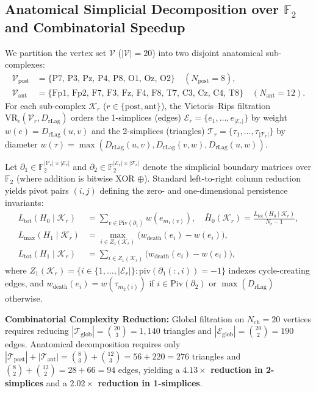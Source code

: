 \documentclass[10pt,twocolumn]{article}
\begin{document}
\subsection{Anatomical Simplicial Decomposition over $\mathbb{F}_2$ and Combinatorial Speedup}
We partition the vertex set $\mathcal{V}$ ($|\mathcal{V}|=20$) into two disjoint anatomical sub-complexes:
\begin{align}
    \mathcal{V}_{\mathrm{post}} &= \{\text{P7, P3, Pz, P4, P8, O1, Oz, O2}\} \quad (N_{\mathrm{post}} = 8), \\
    \mathcal{V}_{\mathrm{ant}} &= \{\text{Fp1, Fp2, F7, F3, Fz, F4, F8, T7, C3, Cz, C4, T8}\} \quad (N_{\mathrm{ant}} = 12).
\end{align}
For each sub-complex $\mathcal{K}_r$ ($r \in \{\mathrm{post}, \mathrm{ant}\}$), the Vietoris--Rips filtration $\mathrm{VR}_\epsilon(\mathcal{V}_r, D_{\mathrm{rLag}})$ orders the 1-simplices (edges) $\mathcal{E}_r = \{e_1,\dots,e_{|\mathcal{E}_r|}\}$ by weight $w(e) = D_{\mathrm{rLag}}(u,v)$ and the 2-simplices (triangles) $\mathcal{T}_r = \{\tau_1,\dots,\tau_{|\mathcal{T}_r|}\}$ by diameter $w(\tau) = \max(D_{\mathrm{rLag}}(u,v), D_{\mathrm{rLag}}(v,w), D_{\mathrm{rLag}}(u,w))$.

Let $\partial_1 \in \mathbb{F}_2^{|\mathcal{V}_r| \times |\mathcal{E}_r|}$ and $\partial_2 \in \mathbb{F}_2^{|\mathcal{E}_r| \times |\mathcal{T}_r|}$ denote the simplicial boundary matrices over $\mathbb{F}_2$ (where addition is bitwise XOR $\oplus$). Standard left-to-right column reduction yields pivot pairs $(i, j)$ defining the zero- and one-dimensional persistence invariants:
\begin{align}
    L_{\mathrm{tot}}(H_0 \mid \mathcal{K}_r) &= \sum_{v \in \mathrm{Piv}(\partial_1)} w(e_{m_1(v)}), \quad \bar{H}_0(\mathcal{K}_r) = \frac{L_{\mathrm{tot}}(H_0 \mid \mathcal{K}_r)}{N_r - 1}, \\
    L_{\max}(H_1 \mid \mathcal{K}_r) &= \max_{i \in Z_1(\mathcal{K}_r)} \big(w_{\mathrm{death}}(e_i) - w(e_i)\big), \\
    L_{\mathrm{tot}}(H_1 \mid \mathcal{K}_r) &= \sum_{i \in Z_1(\mathcal{K}_r)} \big(w_{\mathrm{death}}(e_i) - w(e_i)\big),
\end{align}
where $Z_1(\mathcal{K}_r) = \{i \in \{1,\dots,|\mathcal{E}_r|\} : \mathrm{piv}(\partial_1(:,i)) = -1\}$ indexes cycle-creating edges, and $w_{\mathrm{death}}(e_i) = w(\tau_{m_2(i)})$ if $i \in \mathrm{Piv}(\partial_2)$ or $\max(D_{\mathrm{rLag}})$ otherwise.

\textbf{Combinatorial Complexity Reduction:} Global filtration on $N_{\mathrm{ch}}=20$ vertices requires reducing $|\mathcal{T}_{\mathrm{glob}}| = \binom{20}{3} = 1{,}140$ triangles and $|\mathcal{E}_{\mathrm{glob}}| = \binom{20}{2} = 190$ edges. Anatomical decomposition requires only $|\mathcal{T}_{\mathrm{post}}| + |\mathcal{T}_{\mathrm{ant}}| = \binom{8}{3} + \binom{12}{3} = 56 + 220 = 276$ triangles and $\binom{8}{2} + \binom{12}{2} = 28 + 66 = 94$ edges, yielding a \textbf{$4.13\times$ reduction in 2-simplices} and a \textbf{$2.02\times$ reduction in 1-simplices}.
\end{document}
